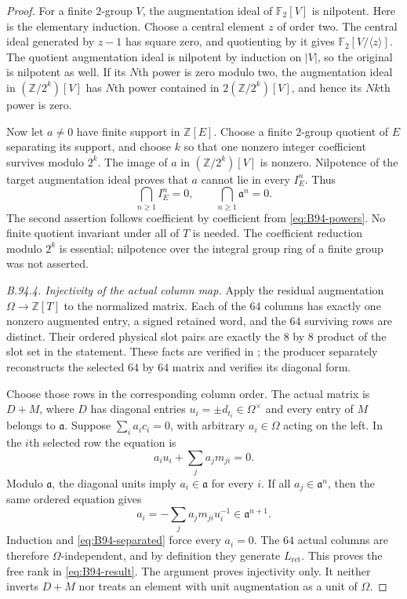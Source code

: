 \begin{proof}
For a finite $2$-group $V$, the augmentation ideal of
$\mathbb F_2[V]$ is nilpotent. Here is the elementary induction.
Choose a central element $z$ of order two. The central ideal
generated by $z-1$ has square zero, and quotienting by it gives
$\mathbb F_2[V/\langle z\rangle]$. The quotient augmentation
ideal is nilpotent by induction on $|V|$, so the original is
nilpotent as well. If its $N$th power is zero modulo two,
the augmentation ideal in $(\mathbb Z/2^k)[V]$ has $N$th
power contained in $2(\mathbb Z/2^k)[V]$, and hence its
$Nk$th power is zero.

Now let $a\ne0$ have finite support in $\mathbb Z[E]$.
Choose a finite $2$-group quotient of $E$ separating its
support, and choose $k$ so that one nonzero integer coefficient
survives modulo $2^k$. The image of $a$ in
$(\mathbb Z/2^k)[V]$ is nonzero. Nilpotence of the target
augmentation ideal proves that $a$ cannot lie in every
$I_E^n$. Thus
\begin{equation}\label{eq:B94-separated}
              \bigcap_{n\geq1}I_E^n=0,
              \qquad\bigcap_{n\geq1}\mathfrak a^n=0.
\end{equation}
The second assertion follows coefficient by coefficient from
\eqref{eq:B94-powers}. No finite quotient invariant under
all of $T$ is needed. The coefficient reduction modulo $2^k$
is essential; nilpotence over the integral group ring of a
finite group was not asserted.

\emph{B.94.4. Injectivity of the actual column map.}
Apply the residual augmentation
$\Omega\to\mathbb Z[T]$ to the normalized matrix. Each
of the $64$ columns has exactly one nonzero augmented entry,
a signed retained word, and the $64$ surviving rows are distinct.
Their ordered physical slot pairs are exactly the $8$ by $8$
product of the slot set in the statement. These facts are
verified in
;
the producer separately reconstructs the selected $64$ by $64$
matrix and verifies its diagonal form.

Choose those rows in the corresponding column order. The actual
matrix is $D+M$, where $D$ has diagonal entries
$u_i=\pm d_{t_i}\in\Omega^\times$ and every entry of $M$
belongs to $\mathfrak a$. Suppose
$\sum_i a_i c_i=0$, with arbitrary $a_i\in\Omega$ acting
on the left. In the $i$th selected row the equation is
\[
                       a_i u_i+\sum_j a_j m_{ji}=0.
\]
Modulo $\mathfrak a$, the diagonal units imply $a_i\in
\mathfrak a$ for every $i$. If all $a_j\in\mathfrak a^n$,
then the same ordered equation gives
\[
                 a_i=-\sum_j a_jm_{ji}u_i^{-1}
                          \in\mathfrak a^{n+1}.
\]
Induction and \eqref{eq:B94-separated} force every $a_i=0$.
The $64$ actual columns are therefore $\Omega$-independent,
and by definition they generate $L_{\mathrm{ret}}$. This
proves the free rank in \eqref{eq:B94-result}. The argument
proves injectivity only. It neither inverts $D+M$ nor treats
an element with unit augmentation as a unit of $\Omega$.


\end{proof}
